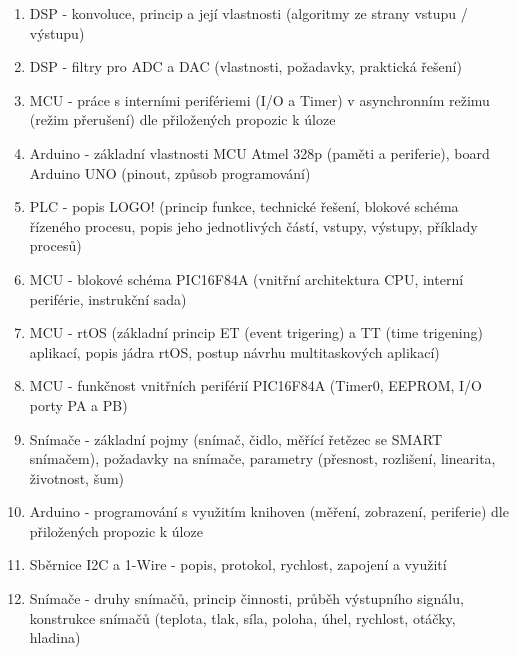 \documentclass[a4paper,11pt]{article}
\begin{document}
\begin{enumerate}
    \item DSP - konvoluce, princip a její vlastnosti (algoritmy ze strany vstupu / výstupu)
    \item DSP - filtry pro ADC a DAC (vlastnosti, požadavky, praktická řešení)
    \item MCU - práce s interními perifériemi (I/O a Timer) v asynchronním režimu (režim přerušení) dle přiložených propozic k úloze
    \item Arduino - základní vlastnosti MCU Atmel 328p (paměti a periferie), board Arduino UNO (pinout, způsob programování)
    \item PLC - popis LOGO! (princip funkce, technické řešení, blokové schéma řízeného procesu, popis jeho jednotlivých částí, vstupy, výstupy, příklady procesů)
    \item MCU - blokové schéma PIC16F84A (vnitřní architektura CPU, interní periférie, instrukční sada)
    \item MCU - rtOS (základní princip ET (event trigering) a TT (time trigening) aplikací, popis jádra rtOS, postup návrhu multitaskových aplikací)
    \item MCU - funkčnost vnitřních periférií PIC16F84A (Timer0, EEPROM, I/O porty PA a PB)
    \item Snímače - základní pojmy (snímač, čidlo, měřící řetězec se SMART snímačem), požadavky na snímače, parametry (přesnost, rozlišení, linearita, životnost, šum)
    \item Arduino - programování s využitím knihoven (měření, zobrazení, periferie) dle přiložených propozic k úloze
    \item Sběrnice I2C a 1-Wire - popis, protokol, rychlost, zapojení a využití
    \item Snímače - druhy snímačů, princip činnosti, průběh výstupního signálu, konstrukce snímačů (teplota, tlak, síla, poloha, úhel, rychlost, otáčky, hladina)
\end{enumerate}

\end{document}
